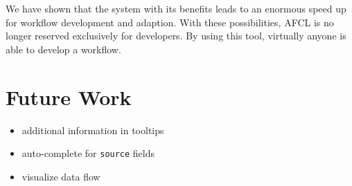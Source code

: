 \documentclass[a4paper,top=25mm,bottom=25mm,12pt,pdftex,halfparskip,twoside,bibtotoc,numbers=noenddot]{scrbook}
\begin{document}
We have shown that the system with its benefits leads to an enormous speed up for workflow development and adaption.
With these possibilities, AFCL is no longer reserved exclusively for developers. By using this tool, virtually anyone is able to develop a workflow.

\section{Future Work}

\begin{itemize}
	\item additional information in tooltips
	\item auto-complete for \texttt{source} fields
	\item visualize data flow
\end{itemize}



\printbibliography
\end{document}
